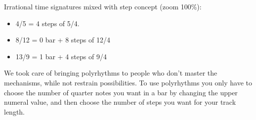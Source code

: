 Irrational time signatures mixed with step concept (zoom 100\%):

\begin{itemize}
\item 4/5 = 4 steps of 5/4.
\item 8/12 = 0 bar + 8 steps of 12/4
\item 13/9 = 1 bar + 4 steps of 9/4
\end{itemize}

We took care of bringing polyrhythms to people who don't master the mechanisms, while not restrain possibilities. To use polyrhythms you only have to choose the number of quarter notes you want in a bar by changing the upper numeral value, and then choose the number of steps you want for your track length.

